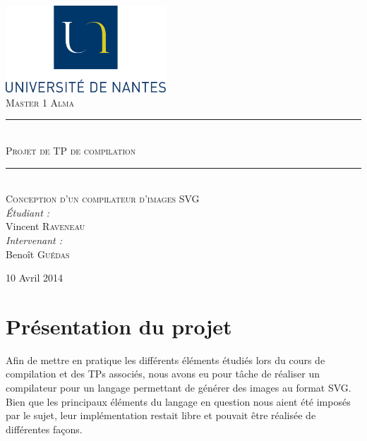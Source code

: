 \documentclass[a4paper, 12pt]{report}
\newcommand{\HRule}{\rule{\linewidth}{0.5mm}}
\begin{document}
\begin{titlepage}
	\begin{center}

		\includegraphics[width=0.45\textwidth]{logoUN.png}~\\[2cm]

		\textsc{\LARGE Master 1 Alma}\\[1.5cm]

		\HRule \\[0.5cm]
		{ \textsc{\Large Projet de TP de compilation}\\[0.5cm] }
		\HRule \\[0.5cm]

		\textsc{\Large Conception d'un compilateur d'images SVG}\\[1.5cm]

		\emph{\'Etudiant :}\\
		Vincent \textsc{Raveneau}\\
		\vspace{0.5cm}
		\emph{Intervenant :} \\
		Beno\^it \textsc{Guédas}
	
		\vfill

		{\large 10 Avril 2014}

	\end{center}
\end{titlepage}

\renewcommand{\contentsname}{Sommaire}
\tableofcontents
\newpage

\chapter{Présentation du projet}

Afin de mettre en pratique les différents éléments étudiés lors du cours de compilation et des TPs associés, nous avons eu pour tâche de réaliser un compilateur pour un langage permettant de générer des images au format SVG. Bien que les principaux éléments du langage en question nous aient été imposés par le sujet, leur implémentation restait libre et pouvait être réalisée de différentes façons.
\end{document}
